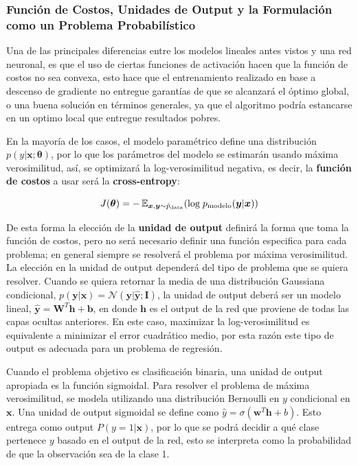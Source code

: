 \subsubsection{Funci\'on de Costos, Unidades de Output y la Formulaci\'on como un Problema Probabil\'istico}

Una de las principales diferencias entre los modelos lineales antes vistos y una red neuronal, es que el uso de ciertas funciones de activaci\'on hacen que la funci\'on de costos no sea convexa, esto hace que el entrenamiento realizado en base a descenso de gradiente no entregue garant\'ias de que se alcanzar\'a el \'optimo global, o una buena solución en términos generales, ya que el algoritmo podría estancarse en un optimo local que entregue resultados pobres. 

En la mayor\'ia de los casos, el modelo param\'etrico define una distribuci\'on $p(y|\bm{x}; \bm{\theta})$, por lo que los par\'ametros del modelo se estimar\'an usando m\'axima verosimilitud, as\'i, se optimizar\'a la log-verosimilitud negativa, es decir, la \textbf{funci\'on de costos} a usar ser\'a la \textbf{cross-entropy}:

\begin{equation}
J(\bm{\theta}) = -\operatorname{\mathbb{E}}_{\bm{x},\bm{y}\sim \hat{p}_{\textrm{data}}}(\textrm{log}\; p_{\textrm{modelo}}(\bm{y}|\bm{x}))
\end{equation}

De esta forma la elecci\'on de la \textbf{unidad de output} definir\'a la forma que toma la funci\'on de costos, pero no ser\'a necesario definir una funci\'on especifica para cada problema; en general siempre se resolver\'a el problema por m\'axima verosimilitud. La elecci\'on en la unidad de output depender\'a del tipo de problema que se quiera resolver. Cuando se quiera retornar la media de una distribuci\'on Gaussiana condicional, $p(\bm{y}|\bm{x}) = \mathcal{N}(\bm{y}|\hat{\bm{y}};\bm{I})$, la unidad de output deber\'a ser un modelo lineal, $\hat{\bm{y}} = \bm{W}^{T}\bm{h} + \bm{b}$, en donde $\bm{h}$ es el output de la red que proviene de todas las capas ocultas anteriores. En este caso, maximizar la log-verosimilitud es equivalente a minimizar el error cuadr\'atico medio, por esta razón este tipo de output es adecuada para un problema de regresión.

Cuando el problema objetivo es clasificaci\'on binaria, una unidad de output apropiada es la funci\'on sigmoidal. Para resolver el problema de m\'axima verosimilitud, se modela utilizando una distribuci\'on Bernoulli en $y$ condicional en $\bm{x}$. Una unidad de output sigmoidal se define como $\hat{{y}} = \sigma(\bm{w}^{T}\bm{h} + {b})$. Esto entrega como output $P(y=1|\bm{x})$, por lo que se podr\'a decidir a qu\'e clase pertenece $y$ basado en el output de la red, esto se interpreta como la probabilidad de que la observaci\'on sea de la clase 1.

